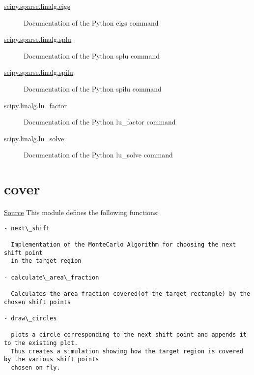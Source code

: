 \documentclass[letterpaper,10pt,english]{sphinxmanual}
\begin{document}
\begin{description}
\item[{\href{http://docs.scipy.org/doc/scipy-0.14.0/reference/generated/scipy.sparse.linalg.eigs.html}{scipy.sparse.linalg.eigs}}] \leavevmode
Documentation of the Python eigs command

\item[{\href{http://docs.scipy.org/doc/scipy-0.14.0/reference/generated/scipy.sparse.linalg.splu.html}{scipy.sparse.linalg.splu}}] \leavevmode
Documentation of the Python splu command

\item[{\href{http://docs.scipy.org/doc/scipy-0.14.0/reference/generated/scipy.sparse.linalg.spilu.html}{scipy.sparse.linalg.spilu}}] \leavevmode
Documentation of the Python spilu command

\item[{\href{http://docs.scipy.org/doc/scipy-0.14.0/reference/generated/scipy.linalg.lu\_factor.html}{scipy.linalg.lu\_factor}}] \leavevmode
Documentation of the Python lu\_factor command

\item[{\href{http://docs.scipy.org/doc/scipy-0.14.0/reference/generated/scipy.linalg.lu\_solve.html}{scipy.linalg.lu\_solve}}] \leavevmode
Documentation of the Python lu\_solve command

\end{description}




\section{cover}
\label{index:cover}
\href{https://bitbucket.org/akadar/brakesqueal0.1/src/10fdbd0824e88ebbee4f44cefa781c01e586db41/brake/solve/cover.py?at=master}{Source}
\label{index:module-brake.solve.cover}
This module defines the following functions:

\begin{Verbatim}[commandchars=\\\{\}]
- next\_shift

  Implementation of the MonteCarlo Algorithm for choosing the next shift point 
  in the target region

- calculate\_area\_fraction

  Calculates the area fraction covered(of the target rectangle) by the chosen shift points
  
- draw\_circles

  plots a circle corresponding to the next shift point and appends it to the existing plot.
  Thus creates a simulation showing how the target region is covered by the various shift points
  chosen on fly.
\end{Verbatim}
\end{document}
